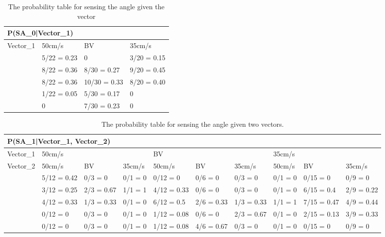 \begin{center}
\begin{table}[H]
\begin{tabular}{|l|l|l|l|}
\hline
\multicolumn{4}{|l|}{P(SA\_0|Vector\_1)} \\ \hline
Vector\_1     & 50cm/s & BV & 35cm/s \\\hline 
[-30 - 0]   & 5/22 = 0.23 & 0    & 3/20 = 0.15   \\ \hline 
[0 - 30]    & 8/22 = 0.36 & 8/30 = 0.27 & 9/20 = 0.45 \\ \hline
[30 - 60]   & 8/22 = 0.36 & 10/30 = 0.33 & 8/20 = 0.40 \\ \hline
[60 - 90]   & 1/22 = 0.05 & 5/30 = 0.17 & 0    \\ \hline
[90- 330]   & 0    & 7/30 = 0.23   & 0    \\ \hline
\end{tabular}
\label{SAtable}
\caption{The probability table for sensing the angle given the vector}
\end{table}
\end{center}

\begin{table}[H]
\centering
\begin{tabular}{|l|p{1.2cm}|p{1.2cm}|p{1.2cm}|p{1.2cm}|p{1.2cm}|p{1.2cm}|p{1.2cm}|p{1.2cm}|p{1.2cm}|}
\hline
\multicolumn{10}{|l|}{P(SA\_1|Vector\_1, Vector\_2)} \\\hline 
Vector\_1 & \multicolumn{3}{l|}{50cm/s} & \multicolumn{3}{l|}{BV} &
\multicolumn{3}{l|}{35cm/s}\\\hline 
Vector\_2 & 50cm/s & BV & 35cm/s & 50cm/s & BV & 35cm/s & 50cm/s & BV & 35cm/s
\\
\hline
[-30 - 0] & 5/12 = 0.42  & 0/3 = 0 & 0/1 = 0 & 0/12 = 0 & 0/6 = 0 & 0/3 = 0 &
0/1 = 0 & 0/15 = 0 & 0/9 = 0 \\ \hline
[0 - 30] & 3/12 = 0.25 & 2/3 = 0.67 & 1/1 = 1 & 4/12 = 0.33 & 0/6 = 0 & 0/3 = 0
& 0/1 = 0 & 6/15 = 0.4 & 2/9 = 0.22 \\ \hline
[30 - 60] & 4/12 = 0.33 & 1/3 = 0.33 & 0/1 = 0 & 6/12 = 0.5 & 2/6 = 0.33 & 1/3 =
0.33 & 1/1 = 1 & 7/15 = 0.47 & 4/9 = 0.44 \\ \hline
[60 - 90] & 0/12 = 0 & 0/3 = 0 & 0/1 = 0 & 1/12 = 0.08 & 0/6 = 0 & 2/3 = 0.67 &
0/1 = 0 & 2/15 = 0.13 & 3/9 = 0.33 \\ \hline
[90 - 330] & 0/12 = 0 & 0/3 = 0 & 0/1 = 0 & 1/12 = 0.08 & 4/6 = 0.67 & 0/3 = 0 &
0/1 = 0 & 0/15 = 0 & 0/9 = 0 \\ \hline
\end{tabular}
\caption{The probability table for sensing the angle given two vectors.}
\label{SDtable2}
\end{table}

